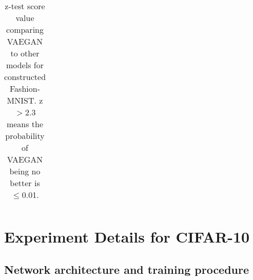 \documentclass{article}
\begin{document}
\begin{table}
{{\begin{tabular}{llll}
\end{tabular}
  }
  \label{appfmnist}%
}
\hfill
\parbox[t]{.5\linewidth}{
 \centering
  \caption{z-test score value comparing VAEGAN to other models for constructed Fashion-MNIST. z$>$2.3 means the probability of VAEGAN being no better is $\leq$0.01.}
  \vspace*{0.1cm} 
  \label{appz test FM}%
}
\end{table}



\section{Experiment Details for CIFAR-10}\label{appcifar}
\subsection{Network architecture and training procedure} 
\end{document}
